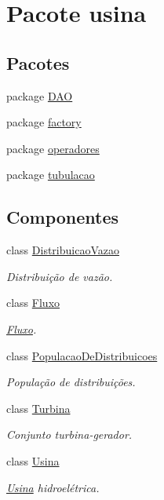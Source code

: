 \hypertarget{namespaceusina}{\section{Pacote usina}
\label{namespaceusina}
}
\subsection*{Pacotes}
\begin{DoxyCompactItemize}
\item 
package \hyperlink{namespaceusina_1_1_d_a_o}{D\-A\-O}
\item 
package \hyperlink{namespaceusina_1_1factory}{factory}
\item 
package \hyperlink{namespaceusina_1_1operadores}{operadores}
\item 
package \hyperlink{namespaceusina_1_1tubulacao}{tubulacao}
\end{DoxyCompactItemize}
\subsection*{Componentes}
\begin{DoxyCompactItemize}
\item 
class \hyperlink{classusina_1_1_distribuicao_vazao}{Distribuicao\-Vazao}
\begin{DoxyCompactList}\small\item\em Distribuição de vazão. \end{DoxyCompactList}\item 
class \hyperlink{classusina_1_1_fluxo}{Fluxo}
\begin{DoxyCompactList}\small\item\em \hyperlink{classusina_1_1_fluxo}{Fluxo}. \end{DoxyCompactList}\item 
class \hyperlink{classusina_1_1_populacao_de_distribuicoes}{Populacao\-De\-Distribuicoes}
\begin{DoxyCompactList}\small\item\em População de distribuições. \end{DoxyCompactList}\item 
class \hyperlink{classusina_1_1_turbina}{Turbina}
\begin{DoxyCompactList}\small\item\em Conjunto turbina-\/gerador. \end{DoxyCompactList}\item 
class \hyperlink{classusina_1_1_usina}{Usina}
\begin{DoxyCompactList}\small\item\em \hyperlink{classusina_1_1_usina}{Usina} hidroelétrica. \end{DoxyCompactList}\end{DoxyCompactItemize}
